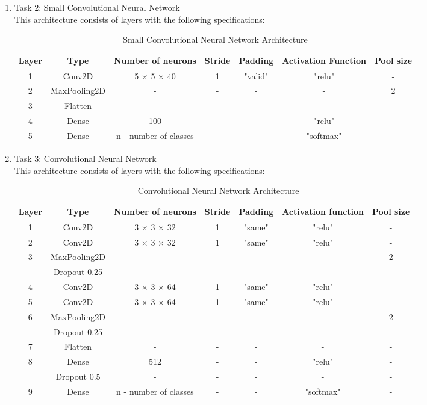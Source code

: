 \documentclass[12pt]{amsart}
\begin{document}
{\begin{enumerate}
	\item{Task 2: Small Convolutional Neural Network} \\

		This architecture consists of layers with the following specifications:

		\begin{table}[h]
		\caption{Small Convolutional Neural Network Architecture}
		\begin{tabular}{c c c c c c c}
		\hline
		Layer & Type & Number of neurons & Stride & Padding & Activation Function & Pool size\\
		\hline
		1 & Conv2D & 5 $\times$ 5 $\times$ 40 & 1 & "valid" & "relu" & -\\
		2 & MaxPooling2D & - & - & - & - & 2\\
		3 & Flatten & - & - & - & - & - \\
		4 & Dense & 100 & - & - & "relu" & - \\
		5 & Dense & n - number of classes & - & - & "softmax" & - \\
		\hline 
		\end{tabular}
		\end{table}
\vfill

\pagebreak
	\item{Task 3: Convolutional Neural Network} \\
		This architecture consists of layers with the following specifications:

		\begin{table}[h]
		\caption{Convolutional Neural Network Architecture}
		\begin{tabular}{c c c c c c c c}
		\hline
		Layer & Type & Number of neurons & Stride & Padding & Activation function & Pool size\\
		\hline
		1 & Conv2D & 3 $\times$ 3 $\times$ 32 & 1 & "same" & "relu" & - \\
		2 & Conv2D & 3 $\times$ 3 $\times$ 32 & 1 & "same" & "relu" & -\\
		3 & MaxPooling2D & - & - & - & - & 2\\
		 & Dropout 0.25 & - & - & - & - & -\\
		4 & Conv2D & 3 $\times$ 3 $\times$ 64 & 1 & "same" & "relu" & - \\
		5 & Conv2D & 3 $\times$ 3 $\times$ 64 & 1 & "same" & "relu" & - \\
		6 & MaxPooling2D & - & - & - & - & 2\\
		& Dropout 0.25 & - & - & - & - & -\\
		7 & Flatten & - & - & - & - & -\\
		8 & Dense & 512 & - & - & "relu" & -\\
		& Dropout 0.5 & - & - & - & - & -\\
		9 & Dense & n - number of classes & - & - & "softmax" & -\\
		\hline 
		\end{tabular}
		\end{table}


\end{enumerate}}
\end{document}
